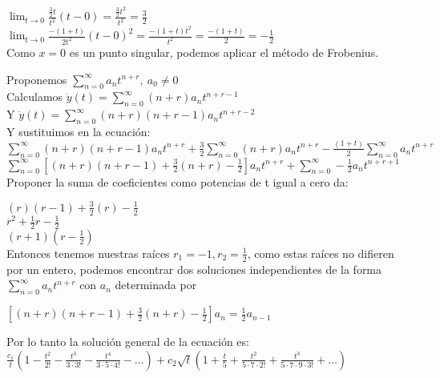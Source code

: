 \documentclass{article}
\begin{document}
\begin{enumerate}
{			$\lim_{t \rightarrow 0} \frac{\frac{3}{2} t}{t^2} (t-0) = \frac{\frac{3}{2}t^2}{t^2} = \frac{3}{2}$\\
			$\lim_{t \rightarrow 0} \frac{-(1+t)}{2t^2} (t-0)^2 = \frac{-(1+t)t^2}{t^2} = \frac{-(1+t)}{2} = -\frac{1}{2}$\\
			
			Como $x = 0$ es un punto singular, podemos aplicar el método de Frobenius.
			
			Proponemos $\sum_{n = 0}^{\infty} a_n t ^{n + r}, \ a_0 \neq 0$\\
			Calculamos $\dot{y}(t) = \sum_{n = 0}^{\infty} (n + r)a_n t ^{n + r -1}$\\
			Y $\ddot{y}(t) = \sum_{n = 0}^{\infty} (n + r)(n + r -1)a_n t ^{n + r -2}$\\
			
			Y sustituimos en la ecuación:\\
			$ \sum_{n = 0}^{\infty} (n + r)(n + r -1)a_n t ^{n + r} + \frac{3}{2}\sum_{n = 0}^{\infty} (n + r)a_n t ^{n + r} - \frac{(1 + t)}{2} \sum_{n = 0}^{\infty} a_n t ^{n + r}$\\
			$ \sum_{n = 0}^{\infty} [(n + r)(n + r -1) + \frac{3}{2}(n + r)  - \frac{1 }{2}] a_n t ^{n + r}  + \sum_{n = 0}^{\infty} - \frac{1}{2} a_{n} t ^{n + r+ 1}$\\
			
			Proponer la suma de coeficientes como potencias de t igual a cero da:
			
			$(r)(r -1) + \frac{3}{2}(r)  - \frac{1}{2}$\\
			$r^2 + \frac{1}{2}r - \frac{1}{2}$\\
			$(r + 1)(r - \frac{1}{2})$\\
			
			Entonces tenemos nuestras raíces $r_1 = -1, r_2 = \frac{1}{2}$, como estas raíces no difieren por un entero, podemos encontrar dos soluciones independientes de la forma $\sum_{n = 0}^{\infty} a_n t ^{n + r}$ con $a_n$ determinada por  
			
			$[(n + r)(n + r -1) + \frac{3}{2}(n + r)  - \frac{1 }{2}]a_n = \frac{1}{2}a_{n-1}$
			
			
			Por lo tanto la solución general de la ecuación es:\\
			
			$\frac{c_1}{t}(1 - \frac{t^2}{2!} - \frac{t^3}{3 \cdot 3 !} - \frac{t^4}{3 \cdot 5 \cdot 4 !} - \dots) + c_2 \sqrt{t} (1 + \frac{t}{5} + \frac{t^2}{5 \cdot 7 \cdot 2 !} + \frac{t^3}{5 \cdot 7 \cdot 9 \cdot 3 !} + \dots)$
        }


\end{enumerate}
\end{document}
